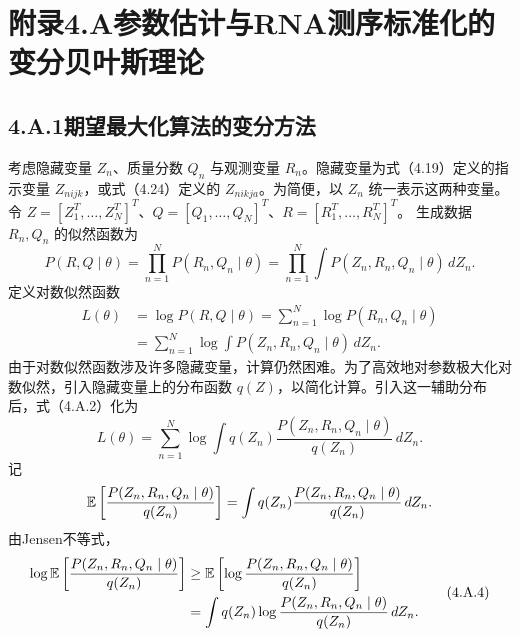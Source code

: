 \section*{附录4.A\quad 参数估计与RNA测序标准化的变分贝叶斯理论}

\subsection*{4.A.1\quad 期望最大化算法的变分方法}

考虑隐藏变量 $Z_n$、质量分数 $Q_n$ 与观测变量 $R_n$。隐藏变量为式（4.19）定义的指示变量 $Z_{nijk}$，或式（4.24）定义的 $Z_{nikja}$。为简便，以 $Z_n$ 统一表示这两种变量。令
$Z=[Z_1^T,\ldots,Z_N^T]^T$、$Q=[Q_1,\ldots,Q_N]^T$、$R=[R_1^T,\ldots,R_N^T]^T$。
生成数据 $R_n,Q_n$ 的似然函数为
\begin{equation}
P(R,Q\mid\theta)=\prod_{n=1}^{N}P(R_n,Q_n\mid\theta)
=\prod_{n=1}^{N}\int P(Z_n,R_n,Q_n\mid\theta)\,dZ_n.\tag{4.A.1}
\end{equation}
定义对数似然函数
\begin{equation}
\begin{aligned}
L(\theta)&=\log P(R,Q\mid\theta)=\sum_{n=1}^{N}\log P(R_n,Q_n\mid\theta)\\
&=\sum_{n=1}^{N}\log\int P(Z_n,R_n,Q_n\mid\theta)\,dZ_n.
\end{aligned}\tag{4.A.2}
\end{equation}
由于对数似然函数涉及许多隐藏变量，计算仍然困难。为了高效地对参数极大化对数似然，引入隐藏变量上的分布函数 $q(Z)$，以简化计算。引入这一辅助分布后，式（4.A.2）化为
\begin{equation}
L(\theta)=\sum_{n=1}^{N}\log\int
q(Z_n)\frac{P(Z_n,R_n,Q_n\mid\theta)}{q(Z_n)}\,dZ_n.\tag{4.A.3}
\end{equation}
记
\[
\mathbb{E}\left[\frac{P(Z_n,R_n,Q_n\mid\theta)}{q(Z_n)}\right]
=\int q(Z_n)\frac{P(Z_n,R_n,Q_n\mid\theta)}{q(Z_n)}\,dZ_n.
\]
由Jensen不等式，
\begin{equation}
\begin{aligned}
\log\mathbb{E}\left[\frac{P(Z_n,R_n,Q_n\mid\theta)}{q(Z_n)}\right]
&\ge\mathbb{E}\left[\log\frac{P(Z_n,R_n,Q_n\mid\theta)}{q(Z_n)}\right]\\
&=\int q(Z_n)\log\frac{P(Z_n,R_n,Q_n\mid\theta)}{q(Z_n)}\,dZ_n.
\end{aligned}\tag{4.A.4}
\end{equation}
